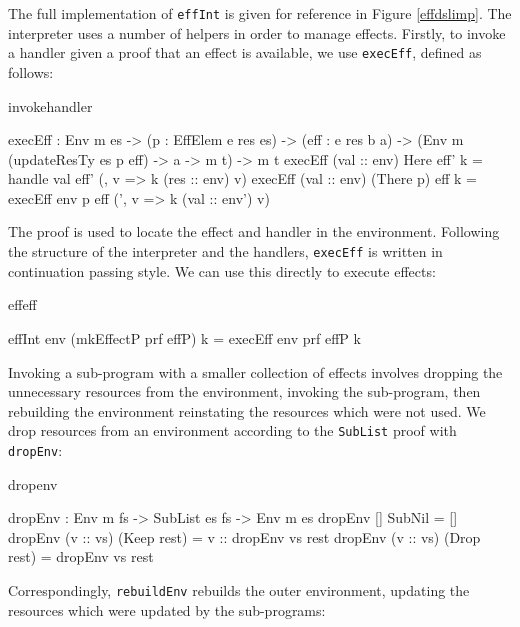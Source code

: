\noindent
The full implementation of \texttt{effInt} is given for reference in
Figure \ref{effdslimp}. The interpreter uses a number of helpers in order
to manage effects. Firstly, to invoke a handler given a proof that an effect
is available, we use \texttt{execEff}, defined as follows:

\noindent
\begin{SaveVerbatim}{invokehandler}

 execEff : Env m es -> (p : EffElem e res es) -> 
           (eff : e res b a) ->
           (Env m (updateResTy es p eff) -> a -> m t) -> 
           m t
 execEff (val :: env) Here eff' k 
     = handle val eff' (\res, v => k (res :: env) v)
 execEff (val :: env) (There p) eff k 
     = execEff env p eff (\env', v => k (val :: env') v)

\end{SaveVerbatim}

\noindent
The proof is used to locate the effect and handler in the environment.
Following the structure of the interpreter and the handlers,
\texttt{execEff} is written in continuation passing style. We can use this
directly to execute effects:

\begin{SaveVerbatim}{effeff}

effInt env (mkEffectP prf effP) k 
                   = execEff env prf effP k

\end{SaveVerbatim}

\noindent
Invoking a sub-program with a smaller collection of effects involves dropping
the unnecessary resources from the environment, invoking the sub-program, then
rebuilding the environment reinstating the resources which were not used.
We drop resources from an environment according to the 
\texttt{SubList} proof with \texttt{dropEnv}:

\begin{SaveVerbatim}{dropenv}

dropEnv : Env m fs -> SubList es fs -> Env m es
dropEnv [] SubNil = []
dropEnv (v :: vs) (Keep rest) = v :: dropEnv vs rest
dropEnv (v :: vs) (Drop rest) = dropEnv vs rest

\end{SaveVerbatim}

\noindent
Correspondingly, \texttt{rebuildEnv} rebuilds the outer environment, updating
the resources which were updated by the sub-programs:

